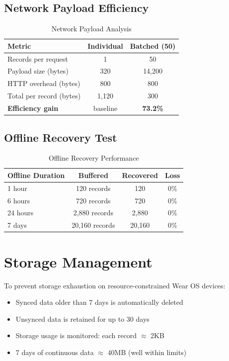 \documentclass[conference]{IEEEtran}
\begin{document}
\subsection{Network Payload Efficiency}

\begin{table}[H]
\centering
\caption{Network Payload Analysis}
\label{tab:payload}
\begin{tabular}{lcc}
\toprule
\textbf{Metric} & \textbf{Individual} & \textbf{Batched (50)} \\
\midrule
Records per request & 1 & 50 \\
Payload size (bytes) & 320 & 14,200 \\
HTTP overhead (bytes) & 800 & 800 \\
Total per record (bytes) & 1,120 & 300 \\
\textbf{Efficiency gain} & baseline & \textbf{73.2\%} \\
\bottomrule
\end{tabular}
\end{table}

\subsection{Offline Recovery Test}

\begin{table}[H]
\centering
\caption{Offline Recovery Performance}
\label{tab:offline}
\begin{tabular}{lccc}
\toprule
\textbf{Offline Duration} & \textbf{Buffered} & \textbf{Recovered} & \textbf{Loss} \\
\midrule
1 hour & 120 records & 120 & 0\% \\
6 hours & 720 records & 720 & 0\% \\
24 hours & 2,880 records & 2,880 & 0\% \\
7 days & 20,160 records & 20,160 & 0\% \\
\bottomrule
\end{tabular}
\end{table}

\section{Storage Management}
To prevent storage exhaustion on resource-constrained Wear OS devices:

\begin{itemize}
    \item Synced data older than 7 days is automatically deleted
    \item Unsynced data is retained for up to 30 days
    \item Storage usage is monitored: each record $\approx$ 2KB
    \item 7 days of continuous data $\approx$ 40MB (well within limits)
\end{itemize}
\end{document}
